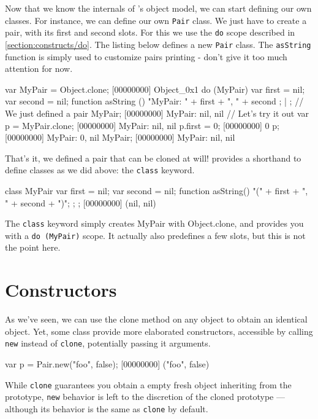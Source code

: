 Now that we know the internals of \urbi's object model, we can start
defining our own classes. For instance, we can define our own
\lstinline{Pair} class. We just have to create a pair, with its first and
second slots. For this we use the \lstinline{do} scope described in
\autoref{section:constructs/do}. The listing below defines a new
\lstinline{Pair} class. The \lstinline{asString} function is simply used to
customize pairs printing - don't give it too much attention for now.

\begin{urbiscript}
var MyPair = Object.clone;
[00000000] Object_0x1
do (MyPair)
{
  var first = nil;
  var second = nil;
  function asString ()
  {
    "MyPair: " + first + ", " + second
  };
} | {};
// We just defined a pair
MyPair;
[00000000] MyPair: nil, nil
// Let's try it out
var p = MyPair.clone;
[00000000] MyPair: nil, nil
p.first = 0;
[00000000] 0
p;
[00000000] MyPair: 0, nil
MyPair;
[00000000] MyPair: nil, nil
\end{urbiscript}

That's it, we defined a pair that can be cloned at will! \us
provides a shorthand to define classes as we did above: the
\lstinline{class} keyword.

\begin{urbiscript}
class MyPair
{
  var first = nil;
  var second = nil;
  function asString() { "(" + first + ", " + second + ")"; };
};
[00000000] (nil, nil)
\end{urbiscript}

The \lstinline{class} keyword simply creates MyPair with Object.clone,
and provides you with a \lstinline|do (MyPair)| scope. It actually also
predefines a few slots, but this is not the point here.

\section{Constructors}
\label{sec:tut:ctor}
As we've seen, we can use the clone method on any object to obtain an
identical object. Yet, some class provide more elaborated
constructors, accessible by calling \lstinline{new} instead of
\lstinline{clone}, potentially passing it arguments.

\begin{urbiscript}
var p = Pair.new("foo", false);
[00000000] ("foo", false)
\end{urbiscript}

While \lstinline{clone} guarantees you obtain a empty fresh object
inheriting from the prototype, \lstinline{new} behavior is left to the
discretion of the cloned prototype --- although its behavior is the
same as \lstinline{clone} by default.

